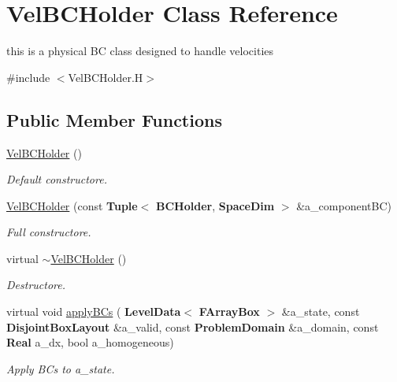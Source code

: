 \hypertarget{class_vel_b_c_holder}{}\section{Vel\+B\+C\+Holder Class Reference}
\label{class_vel_b_c_holder}


this is a physical BC class designed to handle velocities  




{\ttfamily \#include $<$Vel\+B\+C\+Holder.\+H$>$}

\subsection*{Public Member Functions}
\begin{DoxyCompactItemize}
\item 
\mbox{\label{class_vel_b_c_holder_af5fa130e47bbac1e8f01ef5e4ff8453d}} 
\hyperlink{class_vel_b_c_holder_af5fa130e47bbac1e8f01ef5e4ff8453d}{Vel\+B\+C\+Holder} ()
\begin{DoxyCompactList}\small\item\em Default constructore. \end{DoxyCompactList}\item 
\mbox{\label{class_vel_b_c_holder_a8946f96dbe531366cb223f87678e3110}} 
\hyperlink{class_vel_b_c_holder_a8946f96dbe531366cb223f87678e3110}{Vel\+B\+C\+Holder} (const \textbf{ Tuple}$<$ \textbf{ B\+C\+Holder}, \textbf{ Space\+Dim} $>$ \&a\+\_\+component\+BC)
\begin{DoxyCompactList}\small\item\em Full constructore. \end{DoxyCompactList}\item 
\mbox{\label{class_vel_b_c_holder_a3c80e1db72a619f73d535f441824ee82}} 
virtual \hyperlink{class_vel_b_c_holder_a3c80e1db72a619f73d535f441824ee82}{$\sim$\+Vel\+B\+C\+Holder} ()
\begin{DoxyCompactList}\small\item\em Destructore. \end{DoxyCompactList}\item 
\mbox{\label{class_vel_b_c_holder_a917796c7b5448f28fb4a15eae90e86a3}} 
virtual void \hyperlink{class_vel_b_c_holder_a917796c7b5448f28fb4a15eae90e86a3}{apply\+B\+Cs} (\textbf{ Level\+Data}$<$ \textbf{ F\+Array\+Box} $>$ \&a\+\_\+state, const \textbf{ Disjoint\+Box\+Layout} \&a\+\_\+valid, const \textbf{ Problem\+Domain} \&a\+\_\+domain, const \textbf{ Real} a\+\_\+dx, bool a\+\_\+homogeneous)
\begin{DoxyCompactList}\small\item\em Apply B\+Cs to a\+\_\+state. \end{DoxyCompactList}\end{DoxyCompactItemize}
